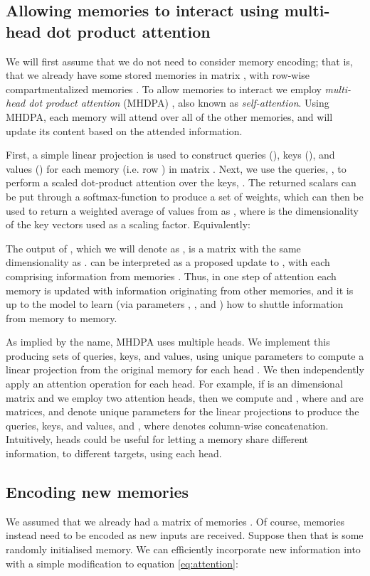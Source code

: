 \documentclass{article}
\begin{document}
\subsection{Allowing memories to interact using multi-head dot product attention}

We will first assume that we do not need to consider memory encoding; that is, that we already have some stored memories in matrix , with row-wise compartmentalized memories . To allow memories to interact we employ \textit{multi-head dot product attention} (MHDPA) \citep{vaswani2017attention}, also known as \textit{self-attention}. Using MHDPA, each memory will attend over all of the other memories, and will update its content based on the attended information.

First, a simple linear projection is used to construct queries (), keys (), and values () for each memory (i.e. row ) in matrix . Next, we use the queries, , to perform a scaled dot-product attention over the keys, . The returned scalars can be put through a softmax-function to produce a set of weights, which can then be used to return a weighted average of values from  as , where  is the dimensionality of the key vectors used as a scaling factor. Equivalently:


The output of , which we will denote as , is a matrix with the same dimensionality as .  can be interpreted as a proposed update to , with each  comprising information from memories . Thus, in one step of attention each memory is updated with information originating from other memories, and it is up to the model to learn (via parameters , , and ) how to shuttle information from memory to memory.

As implied by the name, MHDPA uses multiple heads. We implement this producing  sets of queries, keys, and values, using unique parameters to compute a linear projection from the original memory for each head . We then independently apply an attention operation for each head. For example, if  is an  dimensional matrix and we employ two attention heads, then we compute  and , where  and  are  matrices,  and  denote unique parameters for the linear projections to produce the queries, keys, and values, and , where  denotes column-wise concatenation. Intuitively, heads could be useful for letting a memory share different information, to different targets, using each head.

\subsection{Encoding new memories}
We assumed that we already had a matrix of memories . Of course, memories instead need to be encoded as new inputs are received. Suppose then that  is some randomly initialised memory. We can efficiently incorporate new information  into  with a simple modification to equation \ref{eq:attention}:
\end{document}
